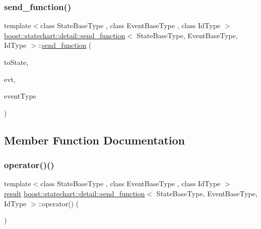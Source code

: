 \subsubsection{\texorpdfstring{send\+\_\+function()}{send\_function()}}
{\footnotesize\ttfamily template$<$class State\+Base\+Type , class Event\+Base\+Type , class Id\+Type $>$ \\
\mbox{\hyperlink{classboost_1_1statechart_1_1detail_1_1send__function}{boost\+::statechart\+::detail\+::send\+\_\+function}}$<$ State\+Base\+Type, Event\+Base\+Type, Id\+Type $>$\+::\mbox{\hyperlink{classboost_1_1statechart_1_1detail_1_1send__function}{send\+\_\+function}} (\begin{DoxyParamCaption}\item[{State\+Base\+Type \&}]{to\+State,  }\item[{const Event\+Base\+Type \&}]{evt,  }\item[{Id\+Type}]{event\+Type }\end{DoxyParamCaption})\hspace{0.3cm}{\ttfamily [inline]}}



\subsection{Member Function Documentation}
\mbox{\label{classboost_1_1statechart_1_1detail_1_1send__function_a129380b34d86c3e11ce9688e208e32ca}} 
\subsubsection{\texorpdfstring{operator()()}{operator()()}}
{\footnotesize\ttfamily template$<$class State\+Base\+Type , class Event\+Base\+Type , class Id\+Type $>$ \\
\mbox{\hyperlink{namespaceboost_1_1statechart_abe807f6598b614d6d87bb951ecd92331}{result}} \mbox{\hyperlink{classboost_1_1statechart_1_1detail_1_1send__function}{boost\+::statechart\+::detail\+::send\+\_\+function}}$<$ State\+Base\+Type, Event\+Base\+Type, Id\+Type $>$\+::operator() (\begin{DoxyParamCaption}{ }\end{DoxyParamCaption})\hspace{0.3cm}{\ttfamily [inline]}}

